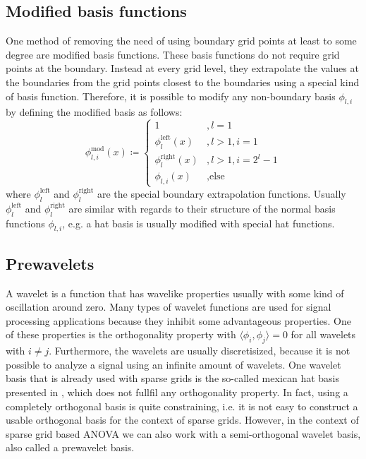 \documentclass[
  a4paper,  %
  twoside,  %
  bibliography=totoc,
  headsepline,
  cleardoublepage=empty,
  parskip=half,
  draft=false
]{scrbook}
\begin{document}
\subsection{Modified basis functions}

One method of removing the need of using boundary grid points at least to some degree are modified basis functions.
These basis functions do not require grid points at the boundary.
Instead at every grid level, they extrapolate the values at the boundaries from the grid points closest to the boundaries using a special kind of basis function.
Therefore, it is possible to modify any non-boundary basis $\phi_{l,i}$ by defining the modified basis as follows:
\begin{equation}
\phi^{\text{mod}}_{l,i}(x) \coloneqq
\begin{cases}
1 &, l=1\\
\phi^{\text{left}}_{l}(x)&, l>1, i=1\\
\phi^{\text{right}}_{l}(x)&, l>1, i=2^l - 1\\
\phi_{l,i}(x)&, \text{else}
\end{cases}
\nonumber
\end{equation}
where $\phi^{\text{left}}_{l}$ and $\phi^{\text{right}}_{l}$ are the special boundary extrapolation functions.
Usually $\phi^{\text{left}}_{l}$ and $\phi^{\text{right}}_{l}$ are similar with regards to their structure of the normal basis functions $\phi_{l,i}$, e.g. a hat basis is usually modified with special hat functions.



\subsection{Prewavelets}

A wavelet is a function that has wavelike properties usually with some kind of oscillation around zero.
Many types of wavelet functions are used for signal processing applications because they inhibit some advantageous properties.
One of these properties is the orthogonality property with $\langle \phi_{i},\phi_{j} \rangle = 0$ for all wavelets with $i \neq j$.
Furthermore,  the wavelets are usually discretisized, because it is not possible to analyze a signal using an infinite amount of wavelets.
One wavelet basis that is already used with sparse grids is the so-called mexican hat basis presented in \cite{}, which does not fullfil any orthogonality property.
In fact, using a completely orthogonal basis is quite constraining, i.e. it is not easy to construct a usable orthogonal basis for the context of sparse grids.
However, in the context of sparse grid based ANOVA we can also work with a semi-orthogonal wavelet basis, also called a prewavelet basis.
\end{document}
